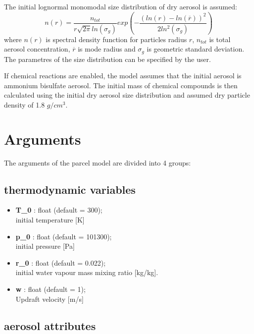 \documentclass[11pt]{article}
\begin{document}
The initial lognormal monomodal size distribution of dry aerosol is assumed:
\begin{equation}
        n(r) = \frac{n_{tot}}{r\sqrt{2\pi}ln(\sigma_g)}exp(-\frac{(ln(r)-ln(\overline{r}))^2}{2ln^2(\sigma_g)})
        \label{lognormalny}
\end{equation}
\noindent
where $n(r)$ is spectral density function for particles radius $r$, $n_{tot}$ is total aerosol concentration, $\overline{r}$ is mode radius and $\sigma_g$ is geometric standard deviation.
The parametres of the size distribution can be specified by the user.

If chemical reactions are enabled, the model assumes that the initial aerosol is ammonium bisulfate aerosol.
The initial mass of chemical compounds is then calculated using the initial 
  dry aerosol size distribution and assumed dry particle density of 1.8 $g/cm^3$.


\section{Arguments}

The arguments of the parcel model are divided into 4 groups:

\subsection{thermodynamic variables}

\begin{itemize}

  \item \textbf{T\_0} : float (default = 300);\\ initial temperature [K]
  \item \textbf{p\_0} : float (default = 101300);\\ initial pressure [Pa]
  \item \textbf{r\_0} : float (default = 0.022);\\ initial water vapour mass mixing ratio [kg/kg].
  \item \textbf{w} : float (default = 1);\\ Updraft velocity [m/s]

\end{itemize}

\subsection{aerosol attributes}
\end{document}
